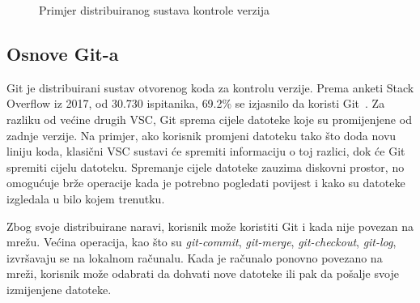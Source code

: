 \begin{figure}[h]

    \caption{Primjer distribuiranog sustava kontrole verzija}%
    \label{fig:02DVCS}
\end{figure}

\subsection{Osnove Git-a}
Git je distribuirani sustav otvorenog koda za kontrolu verzije. Prema anketi Stack Overflow iz 2017,
od 30.730 ispitanika, 69.2\% se izjasnilo da koristi Git~\citep{StackOverflow2017Survey}. Za razliku
od većine drugih VSC, Git sprema cijele datoteke koje su promijenjene od zadnje verzije. Na primjer,
ako korisnik promjeni datoteku tako što doda novu liniju koda, klasični VSC sustavi će spremiti
informaciju o toj razlici, dok će Git spremiti cijelu datoteku. Spremanje cijele datoteke zauzima
diskovni prostor, no omogućuje brže operacije kada je potrebno pogledati povijest i kako su datoteke
izgledala u bilo kojem trenutku.

Zbog svoje distribuirane naravi, korisnik može koristiti Git i kada nije povezan na mrežu. Većina
operacija, kao što su \textit{git-commit}, \textit{git-merge}, \textit{git-checkout},
\textit{git-log}, izvršavaju se na lokalnom računalu. Kada je računalo ponovno povezano na mreži,
korisnik može odabrati da dohvati nove datoteke ili pak da pošalje svoje izmijenjene datoteke.

